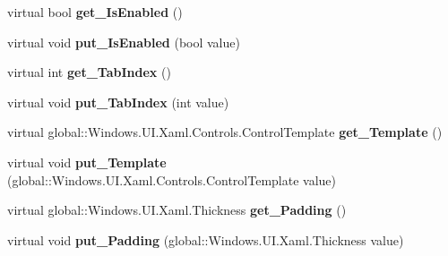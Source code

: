 \begin{DoxyCompactItemize}
virtual bool {\bfseries get\+\_\+\+Is\+Enabled} ()
\item 
\mbox{\label{class_windows_1_1_u_i_1_1_xaml_1_1_controls_1_1_control_ae951ae9f8506d85d623dc31713092569}} 
virtual void {\bfseries put\+\_\+\+Is\+Enabled} (bool value)
\item 
\mbox{\label{class_windows_1_1_u_i_1_1_xaml_1_1_controls_1_1_control_a58eef00fd623bde61c10893d9205700b}} 
virtual int {\bfseries get\+\_\+\+Tab\+Index} ()
\item 
\mbox{\label{class_windows_1_1_u_i_1_1_xaml_1_1_controls_1_1_control_a8314612345a1e430bb7f8d51cdb9b131}} 
virtual void {\bfseries put\+\_\+\+Tab\+Index} (int value)
\item 
\mbox{\label{class_windows_1_1_u_i_1_1_xaml_1_1_controls_1_1_control_a2e40dea64382201f30a45dc2c9db69be}} 
virtual global\+::\+Windows.\+U\+I.\+Xaml.\+Controls.\+Control\+Template {\bfseries get\+\_\+\+Template} ()
\item 
\mbox{\label{class_windows_1_1_u_i_1_1_xaml_1_1_controls_1_1_control_adc937135b0249a6d3425011c1b394db2}} 
virtual void {\bfseries put\+\_\+\+Template} (global\+::\+Windows.\+U\+I.\+Xaml.\+Controls.\+Control\+Template value)
\item 
\mbox{\label{class_windows_1_1_u_i_1_1_xaml_1_1_controls_1_1_control_ae5ac1dbce8d9d993ed0c6ef90a22159d}} 
virtual global\+::\+Windows.\+U\+I.\+Xaml.\+Thickness {\bfseries get\+\_\+\+Padding} ()
\item 
\mbox{\label{class_windows_1_1_u_i_1_1_xaml_1_1_controls_1_1_control_a6898d6903b57a058dd5fb8ef28c5ec58}} 
virtual void {\bfseries put\+\_\+\+Padding} (global\+::\+Windows.\+U\+I.\+Xaml.\+Thickness value)
\item 
\mbox{\label{class_windows_1_1_u_i_1_1_xaml_1_1_controls_1_1_control_ab75bd10489d1a9f3060a3d3d8c060dbd}} 

\end{DoxyCompactItemize}
